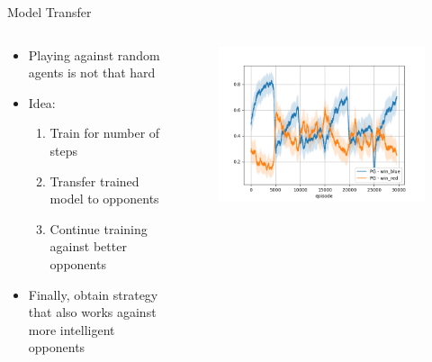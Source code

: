 \documentclass{beamer}
\begin{document}
\begin{frame}{Model Transfer}
\begin{columns}

\begin{block}{}
\begin{itemize}
    \item Playing against random agents is not that hard
    \item Idea:
        \begin{enumerate}
            \item Train for number of steps
            \item Transfer trained model to opponents
            \item Continue training against better opponents
        \end{enumerate}
    \item Finally, obtain strategy that also works against more intelligent opponents
\end{itemize}
\end{block}
\begin{figure}[htp]
    \centering
    \includegraphics[width=\textwidth]{images/iteration/iterative.png}
\end{figure}

\end{columns}
\end{frame}
\end{document}
